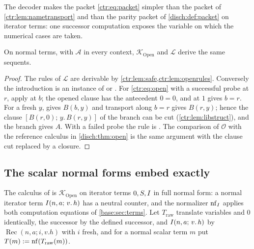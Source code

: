 The decoder makes the packet \eqref{ctr:eq:packet} simpler than the packet of
\cref{ctr:lem:nametransport} and than the parity packet of \cref{disch:def:packet} on
iterator terms: one successor computation exposes the variable on which the numerical cases
are taken.

\begin{theorem}\label{ctr:thm:openequiv}
On normal terms, with $\mathcal A$ in every context, $\mathcal K_{\mathrm{Open}}$ and
$\mathcal L$ derive the same sequents.
\end{theorem}
\begin{proof}
The rules of $\mathcal L$ are derivable by \cref{ctr:lem:safe,ctr:lem:openrules}.
Conversely the introduction is an instance of  or . For
\eqref{ctr:eq:open} with a successful probe at $r$, apply  at $b$; the opened
clause has the antecedent $0=0$, and  at $1$ gives $b=r$. For a fresh $y$,
 gives $B(b,y)$ and transport along $b=r$ gives $B(r,y)$; hence the clause
$[B(r,0);\,y.\,B(r,y)]$ of the branch can be cut (\cref{ctr:lem:libstruct}), and the branch
gives $A$. With a failed probe the rule is . The comparison of $\mathcal O$ with
the reference calculus in \cref{disch:thm:open} is the same argument with the clause cut
replaced by a closure.
\end{proof}

\subsection{The scalar normal forms embed exactly}

The calculus of  is $\mathcal K_{\mathrm{Open}}$ on iterator terms
$0,S,I$ in full normal form: a normal iterator term $I(n,a;\,v.\,h)$ has a neutral
counter, and the normalizer $\operatorname{nf}_I$ applies both computation equations of
\cref{base:sec:terms}. Let $T_{\mathrm{raw}}$ translate variables and $0$ identically, the
successor by the defined successor, and $I(n,a;\,v.\,h)$ by
$\operatorname{Rec}(n,a;i,v.h)$ with $i$ fresh, and for a normal scalar term $m$ put
$T(m)\mathrel{:=}\operatorname{nf}(T_{\mathrm{raw}}(m))$.

